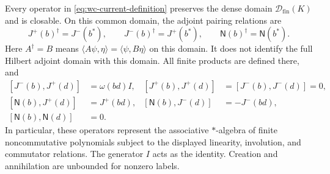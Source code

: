 \begin{theorem}
\label{thm:wc-current}
Every operator in \eqref{eq:wc-current-definition} preserves the dense
domain $\mathcal D_{\mathrm{fin}}(K)$ and is closable.
On this common domain, the adjoint pairing relations are
\begin{equation}
 J^+(b)^\dagger=J^-(b^*),\qquad
 J^-(b)^\dagger=J^+(b^*),\qquad
 \mathsf N(b)^\dagger=\mathsf N(b^*).
 \label{eq:wc-current-star}
\end{equation}
Here $A^\dagger=B$ means
$\langle A\psi,\eta\rangle=\langle\psi,B\eta\rangle$ on this domain.
It does not identify the full Hilbert adjoint domain with this domain.
All finite products are defined there, and
\begin{equation}
 \begin{aligned}
 [J^-(b),J^+(d)]&=\omega(bd)I,&
 [J^+(b),J^+(d)]&=[J^-(b),J^-(d)]=0,\\
 [\mathsf N(b),J^+(d)]&=J^+(bd),&
 [\mathsf N(b),J^-(d)]&=-J^-(bd),\\
 [\mathsf N(b),\mathsf N(d)]&=0.&&
 \end{aligned}
 \label{eq:wc-current-relations}
\end{equation}
In particular, these operators represent the associative $*$-algebra
of finite noncommutative polynomials subject to the displayed linearity,
involution, and commutator relations.  The generator $I$ acts as the identity.
Creation and annihilation are unbounded for nonzero labels.
\end{theorem}
